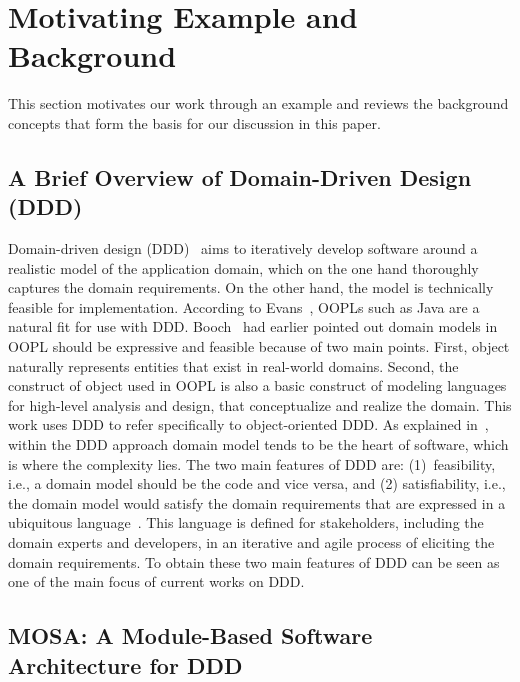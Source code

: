\section{Motivating Example and Background} \label{sect:background}
This section motivates our work through an example and reviews the background concepts that form the basis for our discussion in this paper.


\subsection{A Brief Overview of Domain-Driven Design (DDD)}
\label{sect:bg-arch} %

Domain-driven design (DDD)~\cite{evans_domain-driven_2004} aims to iteratively develop software around a realistic model of the application domain, which on the one hand thoroughly captures the domain requirements. On the other hand, the model is technically feasible for implementation. According to Evans~\cite{evans_domain-driven_2004}, OOPLs such as Java are a natural fit for use with DDD. Booch~\cite{booch_object-oriented_1986} had earlier pointed out domain models in OOPL should be expressive and feasible because of two main points. First, object naturally represents entities that exist in real-world domains. Second, the construct of object used in OOPL is also a basic construct of modeling languages for high-level analysis and design, that conceptualize and realize the domain. This work uses DDD to refer specifically to object-oriented DDD. As explained in~\cite{evans_domain-driven_2004}, within the DDD approach domain model tends to be the heart of software, which is where the complexity lies. The two main features of DDD are: (1)~feasibility, i.e., a domain model should be the code and vice versa, and (2) satisfiability, i.e., the domain model would satisfy the domain requirements that are expressed in a ubiquitous language~\cite{evans_domain-driven_2004}. This language is defined for stakeholders, including the domain experts and developers, in an iterative and agile process of eliciting the domain requirements. To obtain these two main features of DDD can be seen as one of the main focus of current works on DDD. 

\subsection{MOSA: A Module-Based Software Architecture for DDD}
\label{sect:bg-arch} %

